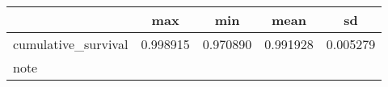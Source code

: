 \begin{tabular}{l*{1}{cccc}}
\toprule
            &         max&         min&        mean&          sd\\
\midrule
cumulative\_survival&    0.998915&    0.970890&    0.991928&    0.005279\\
\bottomrule
\multicolumn{5}{l}{\footnotesize note}\\
\end{tabular}
